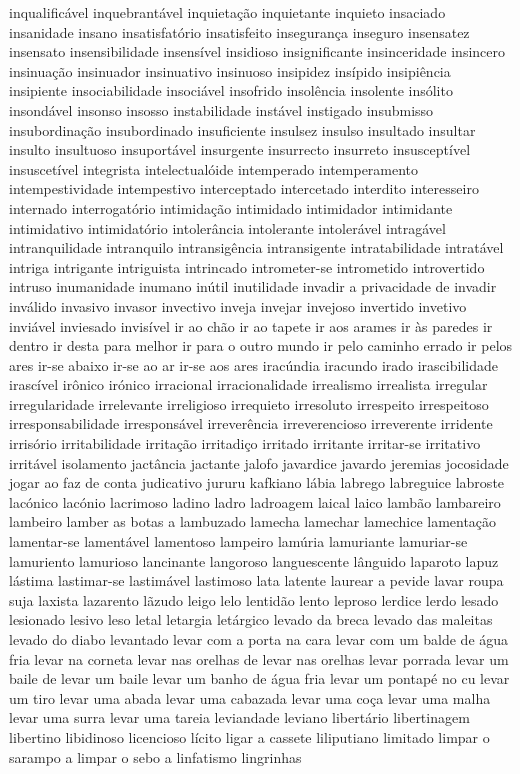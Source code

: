\documentclass[ruledheader]{abnt_UFF}
\begin{document}
inqualific\'{a}vel inquebrant\'{a}vel inquieta\c{c}\~ao inquietante inquieto insaciado insanidade insano insatisfat\'{o}rio insatisfeito inseguran\c{c}a inseguro insensatez insensato insensibilidade insens\'{i}vel insidioso insignificante insinceridade insincero insinua\c{c}\~ao insinuador insinuativo insinuoso insipidez ins\'{i}pido insipi\^{e}ncia insipiente insociabilidade insoci\'{a}vel insofrido insol\^{e}ncia insolente ins\'{o}lito insond\'{a}vel insonso insosso instabilidade inst\'{a}vel instigado insubmisso insubordina\c{c}\~ao insubordinado insuficiente insulsez insulso insultado insultar insulto insultuoso insuport\'{a}vel insurgente insurrecto insurreto insuscept\'{i}vel insuscet\'{i}vel integrista intelectual\'{o}ide intemperado intemperamento intempestividade intempestivo interceptado intercetado interdito interesseiro internado interrogat\'{o}rio intimida\c{c}\~ao intimidado intimidador intimidante intimidativo intimidat\'{o}rio intoler\^{a}ncia intolerante intoler\'{a}vel intrag\'{a}vel intranquilidade intranquilo intransig\^{e}ncia intransigente intratabilidade intrat\'{a}vel intriga intrigante intriguista intrincado intrometer-se intrometido introvertido intruso inumanidade inumano in\'{u}til inutilidade invadir a privacidade de invadir inv\'{a}lido invasivo invasor invectivo inveja invejar invejoso invertido invetivo invi\'{a}vel inviesado invis\'{i}vel ir ao ch\~ao ir ao tapete ir aos arames ir \`{a}s paredes ir dentro ir desta para melhor ir para o outro mundo ir pelo caminho errado ir pelos ares ir-se abaixo ir-se ao ar ir-se aos ares irac\'{u}ndia iracundo irado irascibilidade irasc\'{i}vel ir\^{o}nico ir\'{o}nico irracional irracionalidade irrealismo irrealista irregular irregularidade irrelevante irreligioso irrequieto irresoluto irrespeito irrespeitoso irresponsabilidade irrespons\'{a}vel irrever\^{e}ncia irreverencioso irreverente irridente irris\'{o}rio irritabilidade irrita\c{c}\~ao irritadi\c{c}o irritado irritante irritar-se irritativo irrit\'{a}vel isolamento jact\^{a}ncia jactante jalofo javardice javardo jeremias jocosidade jogar ao faz de conta judicativo jururu kafkiano l\'{a}bia labrego labreguice labroste lac\'{o}nico lac\'{o}nio lacrimoso ladino ladro ladroagem laical laico lamb\~ao lambareiro lambeiro lamber as botas a lambuzado lamecha lamechar lamechice lamenta\c{c}\~ao lamentar-se lament\'{a}vel lamentoso lampeiro lam\'{u}ria lamuriante lamuriar-se lamuriento lamurioso lancinante langoroso languescente l\^{a}nguido laparoto lapuz l\'{a}stima lastimar-se lastim\'{a}vel lastimoso lata latente laurear a pevide lavar roupa suja laxista lazarento l\~azudo leigo lelo lentid\~ao lento leproso lerdice lerdo lesado lesionado lesivo leso letal letargia let\'{a}rgico levado da breca levado das maleitas levado do diabo levantado levar com a porta na cara levar com um balde de \'{a}gua fria levar na corneta levar nas orelhas de levar nas orelhas levar porrada levar um baile de levar um baile levar um banho de \'{a}gua fria levar um pontap\'{e} no cu levar um tiro levar uma abada levar uma cabazada levar uma co\c{c}a levar uma malha levar uma surra levar uma tareia leviandade leviano libert\'{a}rio libertinagem libertino libidinoso licencioso l\'{i}cito ligar a cassete liliputiano limitado limpar o sarampo a limpar o sebo a linfatismo lingrinhas 
\end{document}
